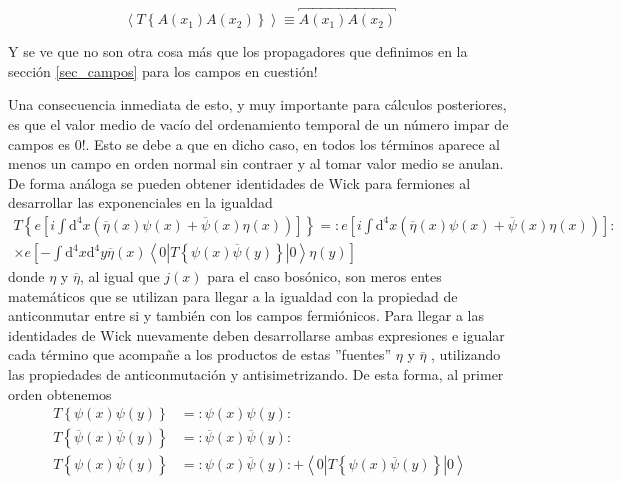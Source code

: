 \documentclass{article}
\numberwithin{equation}{section}
\begin{document}
\begin{equation}\label{key}
\left\langle T\left\{ A(x_{1})A(x_{2})\right\} \right\rangle \equiv \overbracket{A(x_{1})A(x_{2})}
\end{equation}

Y se ve que no son otra cosa más que los propagadores que definimos en la sección \ref{sec_campos} para los campos en cuestión!

Una consecuencia inmediata de esto, y muy importante para cálculos posteriores, es que el valor
medio de vacío del ordenamiento temporal de un número impar de campos
es 0!. Esto se debe a que en dicho caso, en todos los términos aparece
al menos un campo en orden normal sin contraer y al tomar valor medio
se anulan.\\

De forma análoga se pueden obtener identidades de Wick
para fermiones al desarrollar las exponenciales en la igualdad
\begin{equation}\label{wickfer}
\begin{aligned}
T\left\{ e\left[i\int \mathrm{d^4}x\left(\overline{\eta}(x)\psi(x)+\overline{\psi}(x)\eta(x)\right)\right]\right\} =:e\left[i\int \mathrm{d^4}x\left(\overline{\eta}(x)\psi(x)+\overline{\psi}(x)\eta(x)\right)\right]:\\
\times e\left[-\int \mathrm{d^4}x\mathrm{d^4}y\overline{\eta}(x)\left\langle 0|T\left\{ \psi(x)\overline{\psi}(y)\right\} |0\right\rangle \eta(y)\right]
\end{aligned}
\end{equation}
donde $\eta$ y $\overline{\eta}$, al igual que $ j(x) $ para el caso bosónico, son meros entes matemáticos que
se utilizan para llegar a la igualdad con la propiedad de anticonmutar
entre si y también con los campos fermiónicos. Para llegar a las identidades
de Wick nuevamente deben desarrollarse ambas expresiones e igualar
cada término que acompañe a los productos de estas ''fuentes'' $\eta$
y $\overline{\eta}$ , utilizando las propiedades de anticonmutación
y antisimetrizando. De esta forma, al primer orden obtenemos
\begin{align}
T\left\{ \psi(x)\psi(y)\right\}  & =:\psi(x)\psi(y):\\
T\left\{ \overline{\psi}(x)\overline{\psi}(y)\right\}  & =:\overline{\psi}(x)\overline{\psi}(y):\\
T\left\{ \psi(x)\overline{\psi}(y)\right\}  & =:\psi(x)\overline{\psi}(y):+\left\langle 0|T\left\{ \psi(x)\overline{\psi}(y)\right\} |0\right\rangle 
\end{align}
\end{document}
